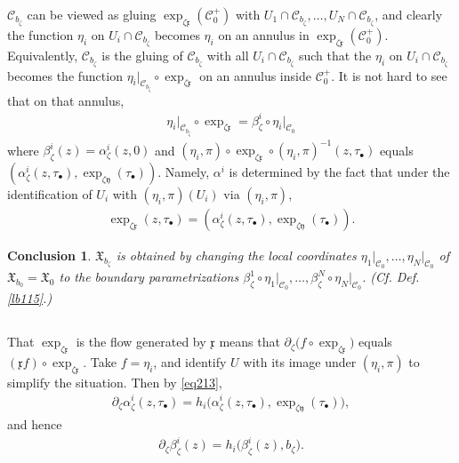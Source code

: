 \documentclass[11pt,b5paper,notitlepage]{article}
\theoremstyle{definition}
\theoremstyle{plain}
\newtheorem{ccl}[df]{Conclusion}
\newcommand{\fk}{\mathfrak}
\newcommand{\mc}{\mathcal}
\newcommand{\xk}{\mathfrak x}
\newcommand{\yk}{\mathfrak y}
\newcommand{\blt}{\bullet}
\numberwithin{equation}{section}
\begin{document}

$\mc C_{b_\zeta}$ can be viewed as gluing $\exp_{\zeta\xk}(\mc C_0^+)$ with $U_1\cap \mc C_{b_\zeta},\dots,U_N\cap\mc C_{b_\zeta}$, and clearly the function $\eta_i$ on $U_i\cap\mc C_{b_\zeta}$ becomes $\eta_i$ on an annulus in $\exp_{\zeta\xk}(\mc C_0^+)$. Equivalently, $\mc C_{b_\zeta}$ is the gluing of $\mc C_{b_\zeta}$ with all $U_i\cap\mc C_{b_\zeta}$ such that the $\eta_i$ on $U_i\cap\mc C_{b_\zeta}$ becomes the function $\eta_i\big|_{\mc C_{b_\zeta}}\circ\exp_{\zeta\xk}$ on an annulus inside $\mc C_0^+$. It is not hard to see that on that annulus,
\begin{align}
\eta_i\big|_{\mc C_{b_\zeta}}\circ\exp_{\zeta\xk}=\beta^i_\zeta\circ\eta_i\big|_{\mc C_0}
\end{align}
where $\beta^i_\zeta(z)=\alpha^i_\zeta(z,0)$ and $(\eta_i,\pi)\circ\exp_{\zeta\xk}\circ (\eta_i,\pi)^{-1}(z,\tau_\blt)$ equals $(\alpha^i_\zeta(z,\tau_\blt),\exp_{\zeta\yk}(\tau_\blt))$. Namely, $\alpha^i$ is determined by the fact that under the identification of $U_i$ with $(\eta_i,\pi)(U_i)$ via $(\eta_i,\pi)$, 
\begin{align}
\exp_{\zeta\xk}(z,\tau_\blt)=(\alpha^i_\zeta(z,\tau_\blt),\exp_{\zeta\yk}(\tau_\blt)).\label{eq236}
\end{align}





\begin{ccl}
$\fk X_{b_\zeta}$ is obtained by changing the local coordinates $\eta_1\big|_{\mc C_0},\dots,\eta_N\big|_{\mc C_0}$ of $\fk X_{b_0}=\fk X_0$ to the boundary parametrizations $\beta^1_\zeta\circ\eta_1\big|_{\mc C_0},\dots,\beta^N_\zeta\circ\eta_N\big|_{\mc C_0}$. (Cf. Def. \ref{lb115}.)
\end{ccl}



\subsection{}\label{lb117}

That $\exp_{\zeta\xk}$ is the flow generated by $\xk$ means that $\partial_\zeta \big(f\circ\exp_{\zeta\xk}\big)$ equals  $(\xk f)\circ\exp_{\zeta\xk}$. Take $f=\eta_i$, and identify $U$ with its image under $(\eta_i,\pi)$ to simplify the situation. Then by \eqref{eq213},
\begin{align}
\partial_\zeta\alpha^i_\zeta(z,\tau_\blt)=h_i\big(\alpha^i_\zeta(z,\tau_\blt),\exp_{\zeta\yk}(\tau_\blt)\big),
\end{align}
and hence
\begin{align}
\partial_\zeta\beta^i_\zeta(z)=h_i\big(\beta^i_\zeta(z),b_\zeta\big).
\end{align}
\end{document}

